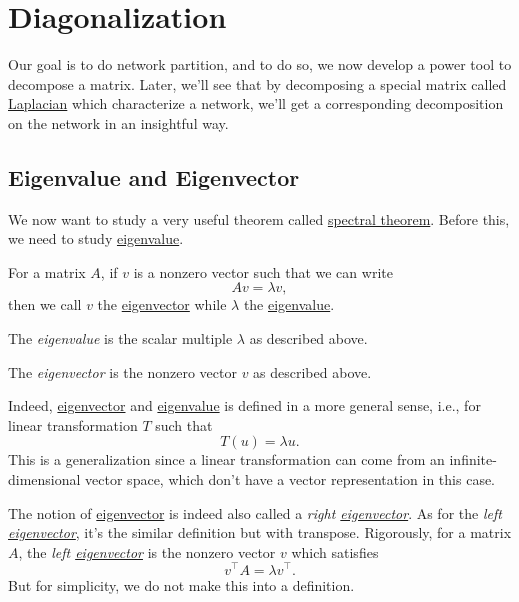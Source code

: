 \chapter{Diagonalization}
Our goal is to do network partition, and to do so, we now develop a power tool to decompose a matrix. Later, we'll see that by decomposing a special matrix called \hyperref[def:Laplacian]{Laplacian} which characterize a network, we'll get a corresponding decomposition on the network in an insightful way.

\section{Eigenvalue and Eigenvector}
We now want to study a very useful theorem called \hyperref[thm:spectral-theorem]{spectral theorem}. Before this, we need to study \hyperref[def:eigenvalue]{eigenvalue}.

\begin{definition*}
	For a matrix \(A\), if \(v\) is a nonzero vector such that we can write
	\[
		Av = \lambda v,
	\]
	then we call \(v\) the \hyperref[def:eigenvector]{eigenvector} while \(\lambda\) the \hyperref[def:eigenvalue]{eigenvalue}.
	\begin{definition}[Eigenvalue]\label{def:eigenvalue}
		The \emph{eigenvalue} is the scalar multiple \(\lambda \) as described above.
	\end{definition}

	\begin{definition}[Eigenvector]\label{def:eigenvector}
		The \emph{eigenvector} is the nonzero vector \(v\) as described above.
	\end{definition}
\end{definition*}

\begin{remark}
	Indeed, \hyperref[def:eigenvector]{eigenvector} and \hyperref[def:eigenvalue]{eigenvalue} is defined in a more general sense, i.e., for linear transformation \(T\) such that
	\[
		T(u) = \lambda u.
	\]
	This is a generalization since a linear transformation can come from an infinite-dimensional vector space, which don't have a vector representation in this case.
\end{remark}

\begin{note}
	The notion of \hyperref[def:eigenvector]{eigenvector} is indeed also called a \emph{right \hyperref[def:eigenvector]{eigenvector}}. As for the \emph{left \hyperref[def:eigenvector]{eigenvector}}, it's the similar definition but with transpose. Rigorously, for a matrix \(A\), the \emph{left \hyperref[def:eigenvector]{eigenvector}} is the nonzero vector \(v\) which satisfies
	\[
		v^{\top} A = \lambda v^{\top}.
	\]
	But for simplicity, we do not make this into a definition.
\end{note}


